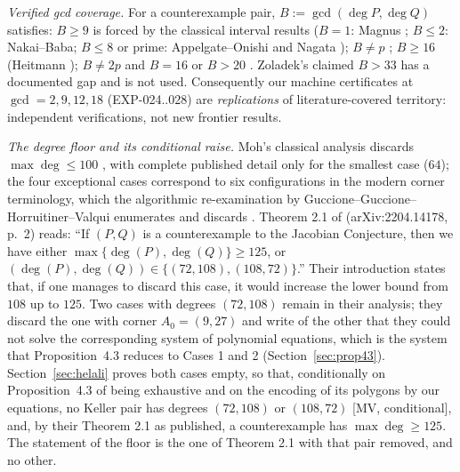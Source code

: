 \documentclass[11pt]{article}
\theoremstyle{remark}
\begin{document}
\emph{Verified gcd coverage.} For a counterexample pair, $B := \gcd(\deg P, \deg Q)$
satisfies: $B \ge 9$ is forced by the classical interval results ($B = 1$: Magnus
\cite{Magnus1955}; $B \le 2$: Nakai--Baba; $B \le 8$ or prime: Appelgate--Onishi
\cite{AppelgateOnishi1985} and Nagata \cite{Nagata1989}); $B \ne p$ \cite{Abhyankar2008};
$B \ge 16$ (Heitmann \cite{Heitmann1990}); $B \ne 2p$ and $B = 16$ or $B > 20$
\cite{GGV2017}. Zoladek's claimed $B > 33$ has a documented gap \cite{GGV2017} and is not
used. Consequently our machine certificates at $\gcd = 2, 9, 12, 18$ (EXP-024..028) are
\emph{replications} of literature-covered territory: independent verifications, not new
frontier results.

\emph{The degree floor and its conditional raise.} Moh's classical analysis discards $\max\deg \le 100$
\cite{Moh1983}, with complete published detail only for the smallest case ($64$); the
four exceptional cases correspond to six configurations in the modern corner terminology,
which the algorithmic re-examination by Guccione--Guccione--Horruitiner--Valqui enumerates
and discards \cite{GGHV2017, GGHV2022}. Theorem 2.1 of \cite{GGHV2022} (arXiv:2204.14178, p.~2) reads: ``If $(P,Q)$ is a counterexample to the Jacobian Conjecture, then we have either
$\max\{\deg(P),\deg(Q)\}\ge125$, or $(\deg(P),\deg(Q))\in\{(72,108),(108,72)\}$.'' Their introduction states that, if one manages to discard this case, it would increase the lower bound from $108$ up to $125$.
Two cases with degrees $(72,108)$ remain in their analysis; they discard the one with corner $A_0=(9,27)$ and write of the other that they could not solve the corresponding system of polynomial equations, which is the system that Proposition~4.3
reduces to Cases 1 and 2 (Section~\ref{sec:prop43}). Section~\ref{sec:helali} proves both cases empty, so that, conditionally on Proposition~4.3 of \cite{GGHV2022} being exhaustive and on the encoding of its polygons by our equations, no Keller pair has degrees $(72,108)$ or $(108,72)$ [MV, conditional],
and, by their Theorem 2.1 as published, a counterexample has $\max\deg\ge125$. The statement of the floor is the one of Theorem 2.1 with that pair removed, and no other.
\end{document}
